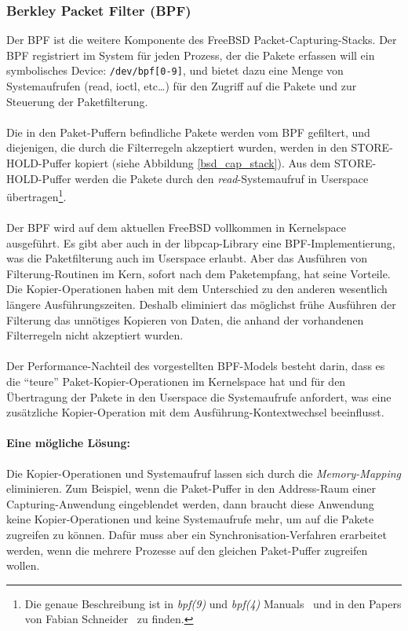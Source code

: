 \subsubsection{Berkley Packet Filter (BPF)}\label{sec:bpf}
Der BPF ist die weitere Komponente des FreeBSD Packet-Capturing-Stacks. Der BPF
registriert im System für jeden Prozess, der die Pakete erfassen will ein
symbolisches Device: \verb+/dev/bpf[0-9]+, und bietet dazu eine Menge von
Systemaufrufen (read, ioctl, etc\ldots) für den Zugriff auf die Pakete und zur
Steuerung der Paketfilterung.\\\\
%
Die in den Paket-Puffern befindliche Pakete werden vom BPF gefiltert, und
diejenigen, die durch die Filterregeln akzeptiert wurden, werden in den
STORE-HOLD-Puffer kopiert (siehe Abbildung \ref{bsd_cap_stack}).  Aus dem
STORE-HOLD-Puffer werden die Pakete durch den \emph{read}-Systemaufruf in
Userspace übertragen\footnote{Die genaue Beschreibung ist in \emph{bpf(9)} und
\emph{bpf(4)} Manuals~\cite{man_kernel_bpf, man_bpf} und in den Papers von Fabian
Schneider~\cite{fabian_da, pcin10gb_paper} zu finden.}.\\\\
%
Der BPF wird auf dem aktuellen FreeBSD vollkommen in Kernelspace ausgeführt.
Es gibt aber auch in der libpcap-Library eine BPF-Implementierung, was  die
Paketfilterung auch im Userspace erlaubt. Aber das Ausführen von
Filterung-Routinen im Kern, sofort nach dem Paketempfang, hat seine Vorteile.
Die Kopier-Operationen haben mit dem Unterschied zu den anderen wesentlich
längere Ausführungszeiten. Deshalb eliminiert das möglichst frühe Ausführen der
Filterung  das unnötiges Kopieren von Daten, die anhand der vorhandenen
Filterregeln nicht akzeptiert wurden.\\\\
%
Der Performance-Nachteil des vorgestellten BPF-Models besteht darin, dass es
die ``teure'' Paket-Kopier-Operationen im Kernelspace hat und für den
Übertragung der Pakete in den Userspace die Systemaufrufe anfordert, was eine
zusätzliche Kopier-Operation mit dem Ausführung-Kontextwechsel beeinflusst.
%
\paragraph*{Eine mögliche Lösung:}
Die Kopier-Operationen und Systemaufruf lassen sich durch die
\emph{Memory-Mapping} eliminieren. Zum Beispiel, wenn die Paket-Puffer in den
Address-Raum einer Capturing-Anwendung eingeblendet werden, dann braucht diese
Anwendung keine Kopier-Operationen und keine Systemaufrufe mehr, um auf die
Pakete zugreifen zu können. Dafür muss aber ein Synchronisation-Verfahren
erarbeitet werden, wenn die mehrere Prozesse auf den gleichen Paket-Puffer
zugreifen wollen.

